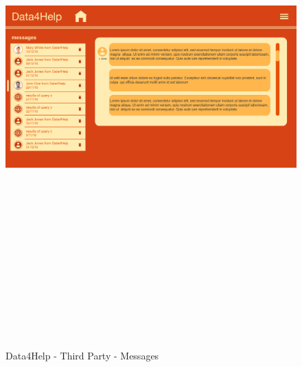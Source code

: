 \begin{figure}[H]
    \includegraphics[width=.6\linewidth, height = 20cm, keepaspectratio]{./Images/Mockups/Data4Help/D4HTP/D4HTP_ShowMessages.png}
    \centering
    \caption{Data4Help - Third Party - Messages}
    \label{fig:sab}
\end{figure}


